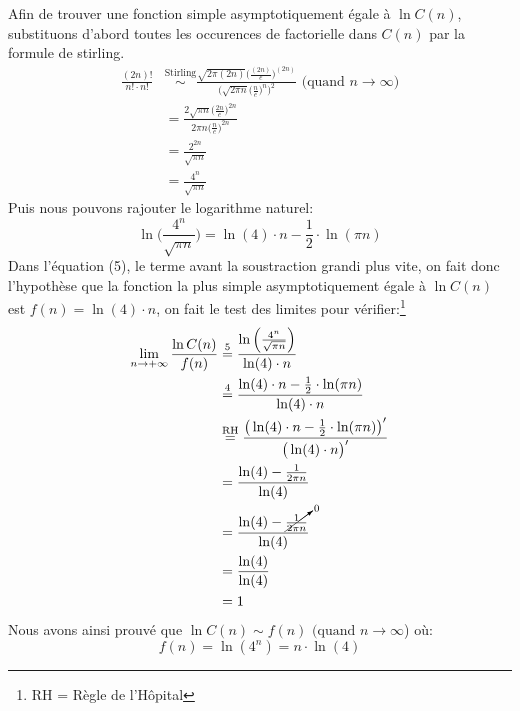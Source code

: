 \documentclass{article}
\begin{document}
\subsubsection{}
Afin de trouver une fonction simple asymptotiquement égale à $\ln C(n)$, substituons d'abord toutes les occurences de factorielle dans $C(n)$ par la formule de stirling.
\begin{equation}
  \begin{aligned}
    \frac{(2n)!}{n! \cdot{} n!} &\stackrel{\text{Stirling}}{\sim} \frac{\sqrt{2\pi(2n)}\Big(\frac{(2n)}{e}\Big)^{(2n)}}{\bigg(\sqrt{2\pi n}\Big(\frac{n}{e}\Big)^n\bigg)^2} \text{  (quand  } n \to \infty \text{)}\\
    &= \frac{2\sqrt{\pi n}\Big(\frac{2n}{e}\Big)^{2n}}{2\pi n \Big(\frac{n}{e}\Big)^{2n}}\\
    &= \frac{2^{2n}}{\sqrt{\pi n}}\\
    &= \frac{4^n}{\sqrt{\pi n}}
  \end{aligned}
\end{equation}
Puis nous pouvons rajouter le logarithme naturel:
\begin{equation}
  \ln\Bigg(\frac{4^n}{\sqrt{\pi n}}\Bigg) = \ln(4)\cdot n - \frac{1}{2}\cdot\ln(\pi n)
\end{equation}
Dans l'équation (5), le terme avant la soustraction grandi plus vite, on fait donc l'hypothèse que la fonction la plus simple asymptotiquement égale à $\ln C(n)$ est $f(n)=\ln(4)\cdot n$, on fait le test des limites pour vérifier:\footnote{RH = Règle de l'Hôpital}
\begin{equation}
  \begin{aligned}
    \lim\limits_{n \rightarrow +\infty} \frac{\ln C(n)}{f(n)} & \stackrel{5}{=}
    \frac {\ln\Big(\frac{4^n}{\sqrt{\pi n}}\Big)} {\ln(4)\cdot n}\\
    & \stackrel{4}{=} \frac {\ln(4)\cdot n - \frac{1}{2}\cdot\ln(\pi n)} {\ln(4)\cdot n}\\
    & \stackrel{\text{RH}}{=} \frac {\big(\ln(4)\cdot n - \frac{1}{2}\cdot\ln(\pi n)\big)'}
          {\big(\ln(4)\cdot n\big)'}\\
          &= \frac {\ln(4) - \frac{1}{2 \pi n}} {\ln(4)}\\
          &= \frac {\ln(4) - \cancelto{0}{\frac{1}{2 \pi n}}} {\ln(4)}\\  
          &= \frac {\ln(4)} {\ln(4)}\\
          &= 1   
  \end{aligned}
\end{equation}
Nous avons ainsi prouvé que $\ln C(n) \sim f(n) \text{   (quand  } n \rightarrow \infty$) où:
$$ f(n) = \ln (4^n) = n \cdot \ln (4) $$
\end{document}
